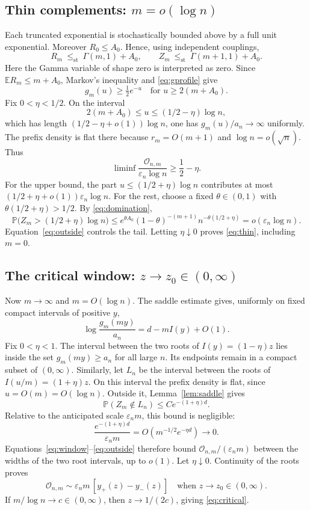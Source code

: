 \documentclass[11pt,a4paper]{article}
\numberwithin{equation}{section}
\theoremstyle{definition}
\theoremstyle{remark}
\newcommand{\E}{\mathbb E}
\newcommand{\Pp}{\mathbb P}
\newcommand{\eps}{\varepsilon}
\newcommand{\ov}{\mathcal O}
\begin{document}
\subsection{Thin complements: \texorpdfstring{$m=o(\log n)$}{m=o(log n)}}
Each truncated exponential is stochastically bounded above by a full
unit exponential. Moreover $R_0\le A_0$. Hence, using independent
couplings,
\begin{equation}\label{eq:domination}
R_m\ \le_{\mathrm{st}}\ \Gamma(m,1)+A_0,
\qquad Z_m\ \le_{\mathrm{st}}\ \Gamma(m+1,1)+A_0.
\end{equation}
Here the Gamma variable of shape zero is interpreted as zero.
Since $\E R_m\le m+A_0$, Markov's inequality and \eqref{eq:gprofile} give
\begin{equation}\label{eq:lowergthin}
g_m(u)\ge\tfrac12e^{-u}\quad\text{for }u\ge2(m+A_0).
\end{equation}
Fix $0<\eta<1/2$. On the interval
\[
2(m+A_0)\le u\le(1/2-\eta)\log n,
\]
which has length $(1/2-\eta+o(1))\log n$, one has $g_m(u)/a_n\to\infty$
uniformly. The prefix density is flat there because $r_m=O(m+1)$ and
$\log n=o(\sqrt n)$. Thus
\[
\liminf\frac{\ov_{n,m}}{\eps_n\log n}\ge\frac12-\eta.
\]
For the upper bound, the part $u\le(1/2+\eta)\log n$ contributes at most
$(1/2+\eta+o(1))\eps_n\log n$. For the rest, choose a fixed
$\theta\in(0,1)$ with $\theta(1/2+\eta)>1/2$. By
\eqref{eq:domination},
\[
\Pp\bigl(Z_m>(1/2+\eta)\log n\bigr)
 \le e^{\theta A_0}(1-\theta)^{-(m+1)}n^{-\theta(1/2+\eta)}
 =o(\eps_n\log n).
\]
Equation~\eqref{eq:outside} controls the tail. Letting $\eta\downarrow0$
proves \eqref{eq:thin}, including $m=0$.

\subsection{The critical window: \texorpdfstring{$z\to z_0\in(0,\infty)$}{z tending to a positive constant}}
Now $m\to\infty$ and $m=O(\log n)$. The saddle estimate gives, uniformly
on fixed compact intervals of positive $y$,
\begin{equation}\label{eq:level}
\log\frac{g_m(my)}{a_n}=d-mI(y)+O(1).
\end{equation}
Fix $0<\eta<1$. The interval between the two roots of
$I(y)=(1-\eta)z$ lies inside the set $g_m(my)\ge a_n$ for all large $n$.
Its endpoints remain in a compact subset of $(0,\infty)$. Similarly,
let $L_n$ be the interval between the roots of $I(u/m)=(1+\eta)z$.
On this interval the prefix density is flat, since $u=O(m)=O(\log n)$.
Outside it, Lemma~\ref{lem:saddle} gives
\[
\Pp(Z_m\notin L_n)\le C e^{-(1+\eta)d}.
\]
Relative to the anticipated scale $\eps_n m$, this bound is negligible:
\[
\frac{e^{-(1+\eta)d}}{\eps_n m}
 =O\!\left(m^{-1/2}e^{-\eta d}\right)\longrightarrow0.
\]
Equations~\eqref{eq:window}--\eqref{eq:outside} therefore bound
$\ov_{n,m}/(\eps_nm)$ between the widths of the two root intervals,
up to $o(1)$. Let $\eta\downarrow0$. Continuity of the roots proves
\begin{equation}\label{eq:criticalproof}
\ov_{n,m}\sim\eps_n m\,[y_+(z)-y_-(z)]
\quad\text{when }z\to z_0\in(0,\infty).
\end{equation}
If $m/\log n\to c\in(0,\infty)$, then $z\to1/(2c)$, giving
\eqref{eq:critical}.
\end{document}
